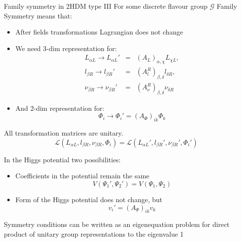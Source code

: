 \documentclass{beamer}
\begin{document}
\begin{frame}{Family symmetry in 2HDM type III}
For some discrete flavour group $\mathcal{G}$ Family Symmetry means that:
\begin{itemize}
\item After fields transformations Lagrangian \alert{does not change}
\item We need 3-dim representation for: 
\begin{eqnarray}
L_{\alpha L}\to L_{\alpha L}'&=&(A_L)_{\alpha,\chi} L_{\chi L}, \nonumber \\ \nonumber l_{\beta R}\to l_{\beta R}'&=& (A_l^R)_{\beta,\delta}l_{\delta R},\\\nonumber \nu_{\beta R}\to \nu_{\beta R}'&=& (A_\nu^R)_{\beta,\delta}\nu_{\delta R}
\end{eqnarray}
\item And 2-dim representation for:
$$\Phi_i\to \Phi_i'=(A_\Phi)_{ik}\Phi_k $$
\end{itemize}

\end{frame}
\begin{frame}
All transformation matrices are unitary.
$$\mathcal{L}(L_{\alpha L},l_{\beta R},\nu_{\beta R},\Phi_i)=\mathcal{L}(L_{\alpha L}',l_{\beta R}',\nu_{\beta R}',\Phi_i')$$

In the Higgs potential two possibilities:
\begin{itemize}
\item Coefficients in the potential remain the same
$$ V(\Psi_1',\Psi_2') = V(\Psi_1,\Psi_2)$$
\item Form of the Higgs potential does not change, but
$$v_i' =(A_{\Psi})_{ik}v_k $$
\end{itemize}
Symmetry conditions can be written as an \alert{eigenequation} problem for direct product of unitary group representations to the eigenvalue 1
\end{frame}

\end{document}
